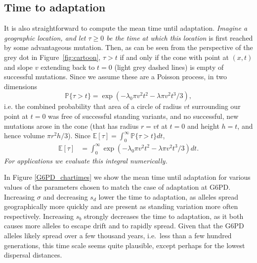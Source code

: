 \documentclass{article}
\newcommand{\gc}[1]{{\it\color{blue} #1} }
\renewcommand{\P}{\mathbb{P}}
\newcommand{\E}{\mathbb{E}}
\begin{document}

\subsection{Time to adaptation}

It is also straightforward to compute the mean time until adaptation.
\gc{Imagine a geographic location, and let $\tau \ge 0$ be the time at
which this location} is first reached by some advantageous mutation.
Then, as can be seen from the
perspective of the grey dot in Figure~\ref{fig:cartoon}, 
$\tau > t$ if and only if the cone with point at $(x,t)$ and slope $v$
extending back to $t=0$ (light grey dashed lines) is empty of successful mutations.
Since we assume these are a Poisson process, 
in two dimensions
\begin{equation} \label{eqn-no-mut-t}
    \P\{ \tau > t \} = \exp\left( - \lambda_0 \pi v^2 t^2 - \lambda \pi v^2 t^3 / 3 \right) ,
\end{equation}
i.e. the combined probability that area of a circle of radius $vt$ surrounding our
point at $t=0$ was free of successful standing variants, and no
successful, new mutations arose in the cone (that has radius $r=vt$ at
$t=0$ and height $h=t$, and hence volume $\pi r^2 h/3$). 
Since $\E[\tau] = \int_0^\infty \P\{ \tau > t \} dt$,
\begin{align}
    \E[\tau] %
        &= \int_0^\infty \exp\left( - \lambda_0 \pi v^2 t^2 - \lambda \pi v^2 t^3 / 3 \right) dt.
\end{align}
\gc{For applications we evaluate this integral numerically. }  %


In Figure \ref{G6PD_chartimes} we show the mean time until adaptation
for various values of the parameters chosen to match the case of
adaptation at G6PD. Increasing $\sigma$ and decreasing $s_d$ lower 
the time to adaptation, as alleles spread geographically more quickly
and are present as standing variation more often
respectively. Increasing $s_b$ strongly decreases the time to
adaptation, as it both causes more alleles to escape drift and to
rapidly spread. Given that the G6PD alleles likely spread over a few
thousand years, i.e.\ less than a few hundred generations, 
this time scale seems quite plausible, except perhaps for the lowest dispersal distances.  
\end{document}
